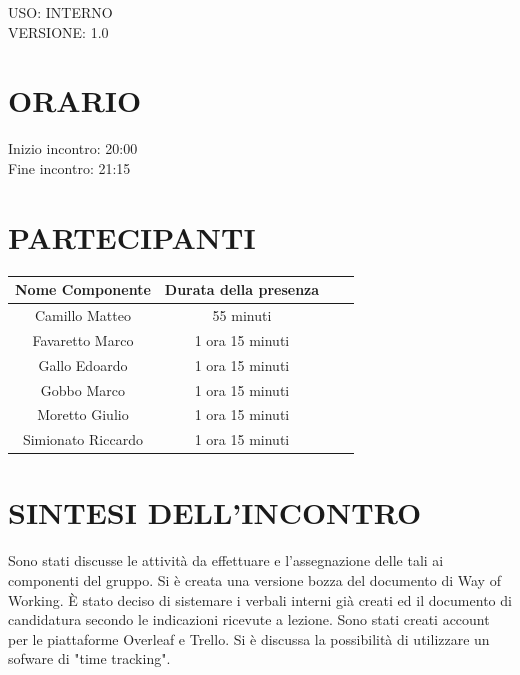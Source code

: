 \documentclass[5pt]{article}
\begin{document}
\begin{flushright}
    \begin{spacing}{1}
        USO: INTERNO\\
        VERSIONE: 1.0\\
    \end{spacing}
\end{flushright}


\restoregeometry

\pagebreak



\section{\Large ORARIO}
\begin{spacing}{1.5}
    {\large Inizio incontro: 20:00}\\
    {\large Fine incontro: 21:15}
\end{spacing}

\section{PARTECIPANTI}
\setlength\cellspacetoplimit{6pt}
\setlength\cellspacebottomlimit{6pt}

\begin{table}[ht]
  \begin{tabular}{|Sc|Sc|}
    \hline
    \textbf{Nome Componente} & \textbf{Durata della presenza} \\
    \hline
    Camillo Matteo & 55 minuti \\
    Favaretto Marco & 1 ora 15 minuti \\
    Gallo Edoardo & 1 ora 15 minuti \\
    Gobbo Marco & 1 ora 15 minuti \\
    Moretto Giulio & 1 ora 15 minuti \\
    Simionato Riccardo & 1 ora 15 minuti \\
    \hline
  \end{tabular}
  \label{tab:conference}
\end{table}

\section{SINTESI DELL'INCONTRO}
Sono stati discusse le attività da effettuare e l'assegnazione delle tali ai componenti del gruppo.
Si è creata una versione bozza del documento di Way of Working. 
È stato deciso di sistemare i verbali interni già creati ed il documento di candidatura secondo le indicazioni ricevute a lezione.
Sono stati creati account per le piattaforme Overleaf e Trello. Si è discussa la possibilità di utilizzare un sofware di "time tracking".
\end{document}

